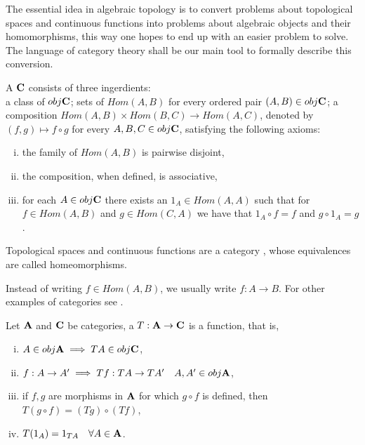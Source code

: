 \documentclass[../1.tex]{subfiles}
\begin{document}
    The essential idea in algebraic topology is to convert problems about topological spaces and continuous functions into
    problems about algebraic objects and their homomorphisms, this way one hopes to end up with an easier problem to solve. 
    The language of category theory shall be our main tool to formally describe this conversion.

    \begin{defn}
        A  $\textbf{C}$ consists of three ingerdients:\\
        a class of  $obj\textbf{C}$; sets of 
        $Hom(A,B)$ for every ordered pair $(A,B) \in obj\textbf{C}$; a composition $Hom(A,B) \times Hom(B,C) \to Hom(A,C)$, denoted
        by $(f,g) \mapsto f \circ g$ for every $A,B,C \in obj\textbf{C}$, satisfying the following axioms:
        \begin{enumerate}[(i)]
            \item the family of $Hom(A,B)$ is pairwise disjoint,
            \item the composition, when defined, is associative,
            \item for each $A \in obj\textbf{C}$ there exists an  $1_A \in Hom(A,A)$ such that for $f \in Hom(A,B)$ and $g \in Hom(C,A)$
                  we have that $1_A \circ f = f$ and $g \circ 1_A = g$.
        \end{enumerate}
    \end{defn}

    \begin{thm}
        Topological spaces and continuous functions are a category , whose equivalences are called homeomorphisms.
    \end{thm}

    Instead of writing $f \in Hom(A,B)$, we usually write $f : A \to B$. For other examples of categories see \cite{rotman}.

    \begin{defn}
        Let $\textbf{A}$ and $\textbf{C}$ be categories, a  $T : \textbf{A} \to \textbf{C}$ is a function, that is, 
        \begin{enumerate}[(i)]
            \item $A \in obj\textbf{A} \implies TA \in obj\textbf{C}$,
            \item $f:A \to A' \implies Tf: TA \to TA' \quad A,A' \in obj\textbf{A}$,
            \item if $f,g$ are morphisms in $\textbf{A}$ for which $g \circ f$ is defined, then $T(g \circ f) = (Tg) \circ (Tf)$,
            \item $T(1_A)= 1_{TA} \quad \forall A \in \textbf{A}$.
        \end{enumerate}
    \end{defn}
\end{document}
